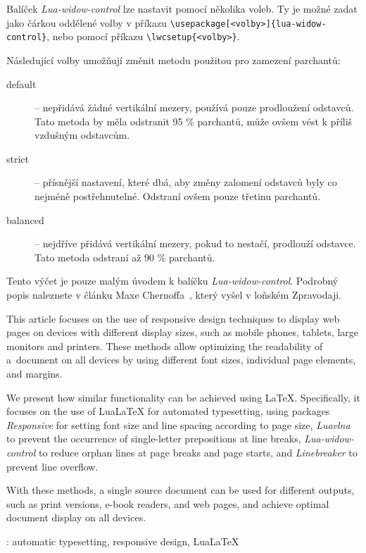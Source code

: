 \documentclass{csbulletin}
\newcommand\balicek[1]{\textit{#1}}
\begin{document}
Balíček \balicek{Lua-widow-control} lze nastavit pomocí několika voleb. Ty je možné zadat jako čárkou oddělené volby 
v příkazu  \verb|\usepackage[<volby>]{lua-widow-control}|, nebo pomocí příkazu 
\verb|\lwcsetup{<volby>}|.

Následující volby umožňují změnit metodu použitou pro zamezení parchantů:

 \begin{description}
   \item[default] – nepřidává žádné vertikální mezery, používá pouze prodloužení odstavců. Tato metoda by měla odstranit 95 \% parchantů, může ovšem vést k příliš vzdušným odstavcům.
   \item[strict] – přísnější nastavení, které dbá, aby změny zalomení odstavců byly co nejméně postřehnutelné.  Odstraní ovšem pouze třetinu parchantů.
   \item[balanced] – nejdříve přidává vertikální mezery, pokud to nestačí, prodlouží odstavce. Tato metoda odstraní až 90 \% parchantů.
  \end{description}

Tento výčet je pouze malým úvodem k balíčku \balicek{Lua-widow-control}. Podrobný popis naleznete v článku Maxe Chernoffa~\cite{chernoff}, který vyšel v loňském Zpravodaji.



\printbibliography

\begin{summary}
  This article focuses on the use of responsive design techniques to display
  web pages on devices with different display sizes, such as mobile phones,
  tablets, large monitors and printers. These methods allow optimizing the
  readability of a~document on all devices by using different font sizes,
  individual page elements, and margins.

  We present how similar functionality can be achieved using \LaTeX.
  Specifically, it focuses on the use of Lua\LaTeX{} for automated typesetting,
  using packages \balicek{Responsive} for setting font size and line spacing according to page size,
  \balicek{Luavlna} to prevent the occurrence of
  single-letter prepositions at line breaks, \balicek{Lua-widow-control} to
  reduce orphan lines at page breaks and page starts, and \balicek{Linebreaker}
  to prevent line overflow.

  With these methods, a single source document can be used for different
  outputs, such as print versions, e-book readers, and web pages, and achieve
  optimal document display on all devices.

\keywords: automatic typesetting, responsive design, Lua\LaTeX
\end{summary}
\end{document}

